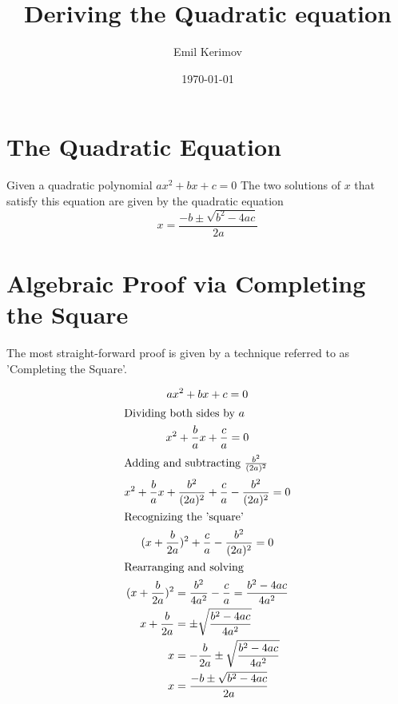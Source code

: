 \documentclass[a4paper]{article}
\title{Deriving the Quadratic equation}
\author{Emil Kerimov}
\date{\today}
\begin{document}
\maketitle

\section{The Quadratic Equation}

Given a quadratic polynomial $ax^2 + bx + c = 0$
The two solutions of $x$ that satisfy this equation are given by the quadratic equation
\begin{equation}
x = \frac{-b \pm \sqrt{b^2 - 4ac}}{2a}
\end{equation}

\section{Algebraic Proof via Completing the Square}
The most straight-forward proof is given by a technique referred to as 'Completing the Square'.

\begin{gather*}
ax^2 + bx + c = 0\\
\shortintertext{Dividing both sides by $a$}
x^2 + \frac{b}{a}x + \frac{c}{a} = 0\\
\shortintertext{Adding and subtracting $\frac{b^2}{(2a)^2}$}
x^2 + \frac{b}{a}x + \frac{b^2}{(2a)^2} +  \frac{c}{a} - \frac{b^2}{(2a)^2} = 0\\
\shortintertext{Recognizing the 'square'}
(x+ \frac{b}{2a})^2 +  \frac{c}{a} - \frac{b^2}{(2a)^2} = 0\\
\shortintertext{Rearranging and solving}
\begin{alignedat}{2}
(x + \frac{b}{2a})^2 &= \frac{b^2}{4a^2}-  \frac{c}{a}  = \frac{b^2-4ac}{4a^2}\\
x + \frac{b}{2a} &=\pm \sqrt{ \frac{b^2 - 4ac}{4a^2}}\\
x  &= - \frac{b}{2a} \pm \sqrt{ \frac{b^2 - 4ac}{4a^2}}\\
x  &= \frac{-b \pm \sqrt{b^2 - 4ac}}{2a}\\
\end{alignedat}
\end{gather*}
\end{document}
